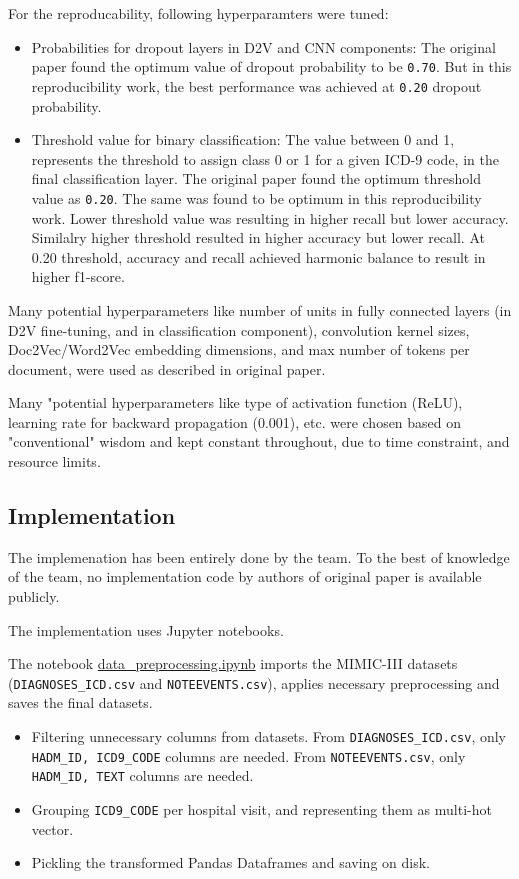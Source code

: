 \documentclass[11pt,a4paper]{article}
\begin{document}
For the reproducability, following hyperparamters were tuned:
\begin{itemize}
	\item Probabilities for dropout layers in D2V and CNN components: The original paper found the optimum value of dropout probability to be \texttt{0.70}. But in this reproducibility work, the best performance was achieved at \texttt{0.20} dropout probability. 
	\item Threshold value for binary classification: The value between 0 and 1, represents the threshold to assign class 0 or 1 for a given ICD-9 code, in the final classification layer. The original paper found the optimum threshold value as \texttt{0.20}. The same was found to be optimum in this reproducibility work. Lower threshold value was resulting in higher recall but lower accuracy. Similalry higher threshold resulted in higher accuracy but lower recall. At 0.20 threshold, accuracy and recall achieved harmonic balance to result in higher f1-score.
\end{itemize}

Many potential hyperparameters like number of units in fully connected layers (in D2V fine-tuning, and in classification component), convolution kernel sizes, Doc2Vec/Word2Vec embedding dimensions, and max number of tokens per document, were used as described in original paper.

Many "potential hyperparameters like type of activation function (ReLU), learning rate for backward propagation (0.001), etc. were chosen based on "conventional" wisdom and kept constant throughout, due to time constraint, and resource limits.

\subsection{Implementation}

The implemenation has been entirely done by the team. To the best of knowledge of the team, no implementation code by authors of original paper is available publicly.

The implementation uses Jupyter notebooks.

The notebook \href{https://github.com/manuv3/cs598-dl-project/blob/main/src/data\_preprocessing.ipynb}{data\_preprocessing.ipynb} imports the MIMIC-III datasets (\texttt{DIAGNOSES\_ICD.csv} and \texttt{NOTEEVENTS.csv}), applies necessary preprocessing and saves the final datasets.
    \begin{itemize}
    		\item Filtering unnecessary columns from datasets. From \texttt{DIAGNOSES\_ICD.csv}, only \texttt{HADM\_ID, ICD9\_CODE} columns are needed. From \texttt{NOTEEVENTS.csv}, only \texttt{HADM\_ID, TEXT} columns are needed.
    		\item Grouping \texttt{ICD9\_CODE} per hospital visit, and representing them as multi-hot vector.
    		\item Pickling the transformed Pandas Dataframes and saving on disk.
    \end{itemize}
\end{document}
